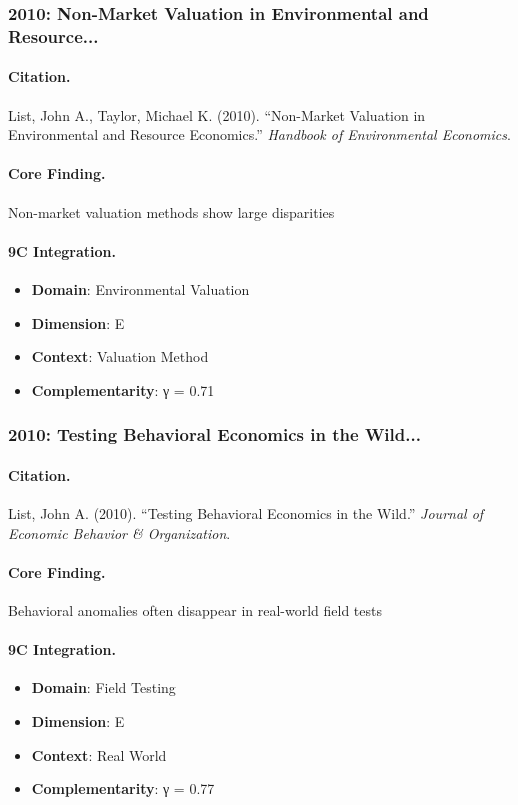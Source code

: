 \subsubsection{2010: Non-Market Valuation in Environmental and Resource...}

\paragraph{Citation.}
List, John A., Taylor, Michael K. (2010). ``Non-Market Valuation in Environmental and Resource Economics.''
\textit{Handbook of Environmental Economics}.

\paragraph{Core Finding.}
Non-market valuation methods show large disparities

\paragraph{9C Integration.}
\begin{itemize}[nosep]
  \item \textbf{Domain}: Environmental Valuation
  \item \textbf{Dimension}: E
  \item \textbf{Context}: Valuation Method
  \item \textbf{Complementarity}: γ = 0.71
\end{itemize}


\subsubsection{2010: Testing Behavioral Economics in the Wild...}

\paragraph{Citation.}
List, John A. (2010). ``Testing Behavioral Economics in the Wild.''
\textit{Journal of Economic Behavior & Organization}.

\paragraph{Core Finding.}
Behavioral anomalies often disappear in real-world field tests

\paragraph{9C Integration.}
\begin{itemize}[nosep]
  \item \textbf{Domain}: Field Testing
  \item \textbf{Dimension}: E
  \item \textbf{Context}: Real World
  \item \textbf{Complementarity}: γ = 0.77
\end{itemize}


